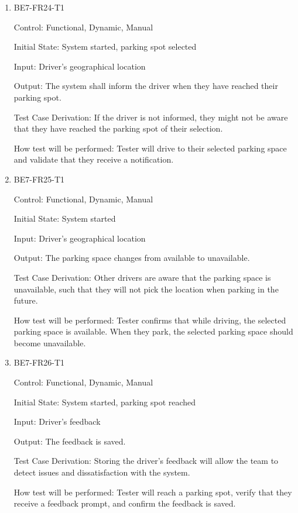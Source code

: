 \documentclass[12pt, titlepage]{article}
\begin{document}
\begin{enumerate}

\item{BE7-FR24-T1}

Control: Functional, Dynamic, Manual
					
Initial State: System started, parking spot selected
					
Input: Driver's geographical location
					
Output: The system shall inform the driver when they have reached their parking
spot.

Test Case Derivation: If the driver is not informed, they might not be aware
that they have reached the parking spot of their selection.
					
How test will be performed: Tester will drive to their selected parking space
and validate that they receive a notification.

\item{BE7-FR25-T1}

Control: Functional, Dynamic, Manual
					
Initial State: System started
					
Input: Driver's geographical location
					
Output: The parking space changes from available to unavailable.

Test Case Derivation: Other drivers are aware that the parking space is
unavailable, such that they will not pick the location when parking in the
future.
					
How test will be performed: Tester confirms that while driving, the selected
parking space is available. When they park, the selected parking space should
become unavailable.

\item{BE7-FR26-T1}

Control: Functional, Dynamic, Manual
					
Initial State: System started, parking spot reached
					
Input: Driver's feedback
					
Output: The feedback is saved.

Test Case Derivation: Storing the driver's feedback will allow the team to
detect issues and dissatisfaction with the system.
					
How test will be performed: Tester will reach a parking spot, verify that they
receive a feedback prompt, and confirm the feedback is saved.

\end{enumerate}
\end{document}
